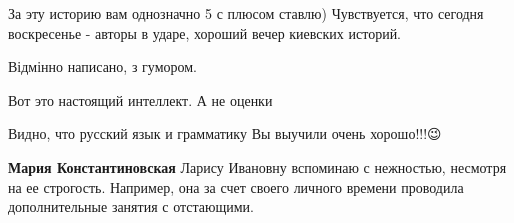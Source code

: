 \begin{itemize}
\begin{itemize}
\end{itemize}

 
За эту историю вам однозначно 5 с плюсом ставлю)
Чувствуется, что сегодня воскресенье - авторы в ударе, хороший вечер киевских историй.


 
Відмінно написано, з гумором.


 
Вот это настоящий интеллект. А не оценки


 
Видно, что русский язык и грамматику Вы выучили очень хорошо!!!😉

\begin{itemize}
 
\textbf{Мария Константиновская} Ларису Ивановну вспоминаю с нежностью, несмотря
на ее строгость. Например, она за счет своего личного времени проводила
дополнительные занятия с отстающими.
\end{itemize}

 

\end{itemize}
